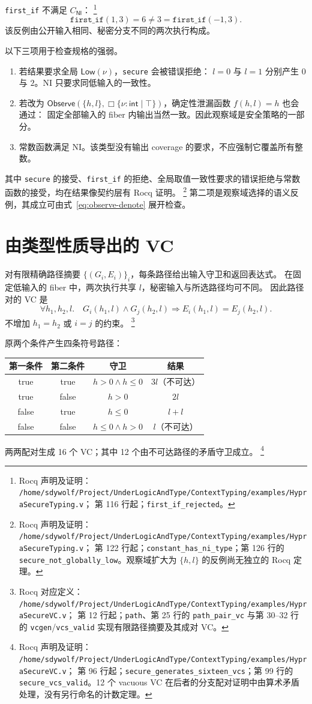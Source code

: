 \documentclass[UTF8,a4paper,11pt,fontset=fandol]{ctexart}
\newcommand{\oty}[2]{\{\nu:#1\mid #2\}}
\newcommand{\Low}{\ensuremath{\mathsf{Low}}}
\newcommand{\Observe}{\ensuremath{\mathsf{Observe}}}
\newcommand{\NI}{\mathsf{NI}}
\newcommand{\rocqnote}[3]{%
  \footnote{Rocq 声明及证明：
  \nolinkurl{/home/sdywolf/Project/UnderLogicAndType/#1}；
  第 #2 行起；#3。}}
\newcommand{\rocqdefnote}[3]{%
  \footnote{Rocq 对应定义：
  \nolinkurl{/home/sdywolf/Project/UnderLogicAndType/#1}；
  第 #2 行起；#3。}}
\begin{document}
\texttt{first\_if} 不满足 $C_{\NI}$：\rocqnote{ContextTyping/examples/HypraSecureTyping.v}{116}{\texttt{first\_if\_rejected}}
\[
 \texttt{first\_if}(1,3)=6\ne3=\texttt{first\_if}(-1,3).
\]
该反例由公开输入相同、秘密分支不同的两次执行构成。

以下三项用于检查规格的强弱。
\begin{enumerate}
\item 若结果要求全局 $\Low(\nu)$，\texttt{secure} 会被错误拒绝：
      $l=0$ 与 $l=1$ 分别产生 $0$ 与 $2$。NI 只要求同低输入的一致性。
\item 若改为 $\Observe(\{h,l\},\Box\oty{\mathsf{int}}{\top})$，确定性泄漏函数 $f(h,l)=h$ 也会通过：
      固定全部输入的 fiber 内输出当然一致。因此观察域是安全策略的一部分。
\item 常数函数满足 NI。该类型没有输出 coverage 的要求，不应强制它覆盖所有整数。
\end{enumerate}
其中 \texttt{secure} 的接受、\texttt{first\_if} 的拒绝、全局取值一致性要求的错误拒绝与常数函数的接受，均在结果像契约层有 Rocq 证明。\rocqnote{ContextTyping/examples/HypraSecureTyping.v}{122}{\texttt{constant\_has\_ni\_type}；第 126 行的 \texttt{secure\_not\_globally\_low}。观察域扩大为 $\{h,l\}$ 的反例尚无独立的 Rocq 定理}
第二项是观察域选择的语义反例，其成立可由式~\eqref{eq:observe-denote} 展开检查。

\section{由类型性质导出的 VC}

对有限精确路径摘要 $\{(G_i,E_i)\}_i$，每条路径给出输入守卫和返回表达式。
在固定低输入的 fiber 中，两次执行共享 $l$，秘密输入与所选路径均可不同。
因此路径对的 VC 是
\begin{equation}\label{eq:vc}
 \forall h_1,h_2,l.\quad
 G_i(h_1,l)\land G_j(h_2,l)
 \Longrightarrow E_i(h_1,l)=E_j(h_2,l).
\end{equation}
不增加 $h_1=h_2$ 或 $i=j$ 的约束。
\rocqdefnote{ContextTyping/examples/HypraSecureVC.v}{12}{\texttt{path}、第 25 行的 \texttt{path\_pair\_vc} 与第 30--32 行的 \texttt{vcgen}/\texttt{vcs\_valid} 实现有限路径摘要及其成对 VC}

原两个条件产生四条符号路径：
\begin{center}
\begin{tabular}{@{}cccc@{}}
\toprule
第一条件 & 第二条件 & 守卫 & 结果\\
\midrule
true & true & $h>0\land h\le0$ & $3l$（不可达）\\
true & false & $h>0$ & $2l$\\
false & true & $h\le0$ & $l+l$\\
false & false & $h\le0\land h>0$ & $l$（不可达）\\
\bottomrule
\end{tabular}
\end{center}
两两配对生成 16 个 VC；其中 12 个由不可达路径的矛盾守卫成立。\rocqnote{ContextTyping/examples/HypraSecureVC.v}{96}{\texttt{secure\_generates\_sixteen\_vcs}；第 99 行的 \texttt{secure\_vcs\_valid}。12 个 vacuous VC 在后者的分支配对证明中由算术矛盾处理，没有另行命名的计数定理}
\end{document}
